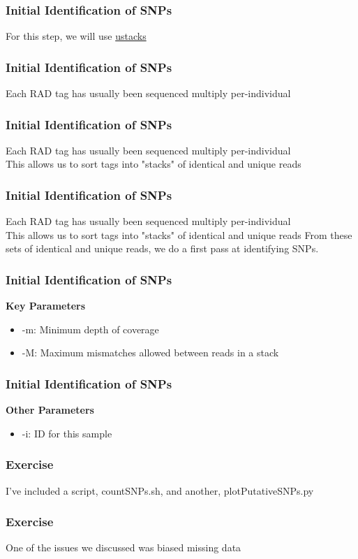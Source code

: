 \documentclass{beamer}
\begin{document}
\begin{frame}
\frametitle{Initial Identification of SNPs}
For this step, we will use \href{http://catchenlab.life.illinois.edu/stacks/comp/ustacks.php}{ustacks}
\end{frame}

\begin{frame}
\frametitle{Initial Identification of SNPs}
Each RAD tag has usually been sequenced multiply per-individual
\end{frame}

\begin{frame}
\frametitle{Initial Identification of SNPs}
Each RAD tag has usually been sequenced multiply per-individual \\
This allows us to sort tags into "stacks" of identical and unique reads
\end{frame}

\begin{frame}
\frametitle{Initial Identification of SNPs}
Each RAD tag has usually been sequenced multiply per-individual \\
This allows us to sort tags into "stacks" of identical and unique reads
From these sets of identical and unique reads, we do a first pass at identifying SNPs.
\end{frame}

\begin{frame}
\frametitle{Initial Identification of SNPs}
\textbf{Key Parameters}
\begin{itemize}
\item -m: Minimum depth of coverage
\item -M: Maximum mismatches allowed between reads in a stack
\end{itemize}
\end{frame}

\begin{frame}
\frametitle{Initial Identification of SNPs}
\textbf{Other Parameters}
\begin{itemize}
\item -i: ID for this sample
\end{itemize}
\end{frame}

\begin{frame}
\frametitle{Exercise}
I've included a script, countSNPs.sh, and another, plotPutativeSNPs.py
\end{frame}

\begin{frame}
\frametitle{Exercise}
One of the issues we discussed was biased missing data
\end{frame}
\end{document}
